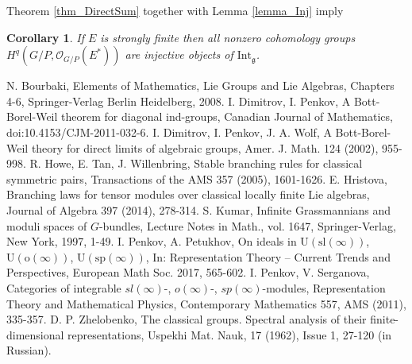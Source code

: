 \documentclass[12pt]{article}
\renewcommand{\sl} {\mathrm{sl}}
\newcommand{\oo}  {\mathrm{o}}
\renewcommand{\sp}   {\mathrm{sp}}
\newcommand{\Int} {\mathrm{Int}}
\def \OO {{\mathcal O}}
\def \g {\mathfrak{g}}
\newtheorem{coro}[theorem]{Corollary}
\begin{document}
Theorem \ref{thm_DirectSum} together with Lemma \ref{lemma_Inj} imply
\begin{coro} If $E$ is strongly finite then all nonzero cohomology groups $H^q(G/P, \OO_{G/P}(E^*))$ are injective objects of $\Int_{\g}$. 
\end{coro}




\begin{thebibliography}{20}
\small{
 N. Bourbaki, Elements of Mathematics, Lie Groups and Lie Algebras, Chapters 4-6, Springer-Verlag Berlin Heidelberg, 2008.
 I. Dimitrov, I. Penkov, A Bott-Borel-Weil theorem for diagonal ind-groups, Canadian Journal of Mathematics, doi:10.4153/CJM-2011-032-6. 
 I. Dimitrov, I. Penkov, J. A. Wolf, A Bott-Borel-Weil theory for direct limits of algebraic groups, Amer. J. Math. 124 (2002), 955-998.
 R. Howe, E. Tan, J. Willenbring, Stable branching rules for classical symmetric pairs, Transactions of the AMS 357 (2005), 1601-1626.
 E. Hristova, Branching laws for tensor modules over classical locally finite Lie algebras, Journal of Algebra 397 (2014), 278-314.
 S. Kumar, Infinite Grassmannians and moduli spaces of $G$-bundles, Lecture Notes in Math., vol. 1647, Springer-Verlag, New York, 1997, 1-49.
 I. Penkov, A. Petukhov, On ideals in $\mathrm{U}(\sl(\infty))$, $\mathrm{U}(\oo(\infty))$, $\mathrm{U}(\sp(\infty))$, In: Representation Theory -- Current Trends and Perspectives, European Math Soc. 2017, 565-602.
 I. Penkov, V. Serganova, Categories of integrable $sl(\infty)$-, $o(\infty)$-, $sp(\infty)$-modules, Representation Theory and Mathematical Physics, Contemporary Mathematics 557, AMS (2011), 335-357.
 D. P. Zhelobenko, The classical groups. Spectral analysis of their finite-dimensional representations, Uspekhi Mat. Nauk,
17 (1962), Issue 1, 27-120 (in Russian).
}
\end{thebibliography} 

\vspace{0.4cm}
\small{
\author{\noindent Elitza Hristova, Institute of Mathematics and Informatics, Bulgarian Academy of Sciences, Acad. Georgi Bonchev Str., Block 8, 1113 Sofia, Bulgaria. \\ E-mail: e.hristova@math.bas.bg}\\

\author{\noindent Ivan Penkov, Jacobs University Bremen, School of Engineering and Science, Campus Ring 1, 28759 Bremen, Germany. \\ E-mail: i.penkov@jacobs-university.de}
}
\end{document}
